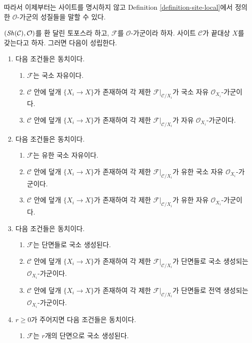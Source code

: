 \noindent
따라서 이제부터는 사이트를 명시하지 않고 Definition
\ref{definition-site-local}에서 정의한 $\mathcal{O}$-가군의 성질들을
말할 수 있다.

\begin{lemma}
\label{lemma-local-final-object}
$(\mathop{\mathit{Sh}}\nolimits(\mathcal{C}), \mathcal{O})$를 환 달린 토포스라 하고,
$\mathcal{F}$를 $\mathcal{O}$-가군이라 하자. 사이트 $\mathcal{C}$가 끝대상
$X$를 갖는다고 하자. 그러면 다음이 성립한다.
\begin{enumerate}
\item 다음 조건들은 동치이다.
\begin{enumerate}
\item $\mathcal{F}$는 국소 자유이다.
\item $\mathcal{C}$ 안에 덮개 $\{X_i \to X\}$가 존재하여 각 제한
$\mathcal{F}|_{\mathcal{C}/X_i}$가 국소 자유 $\mathcal{O}_{X_i}$-가군이다.
\item $\mathcal{C}$ 안에 덮개 $\{X_i \to X\}$가 존재하여 각 제한
$\mathcal{F}|_{\mathcal{C}/X_i}$가 자유 $\mathcal{O}_{X_i}$-가군이다.
\end{enumerate}
\item 다음 조건들은 동치이다.
\begin{enumerate}
\item $\mathcal{F}$는 유한 국소 자유이다.
\item $\mathcal{C}$ 안에 덮개 $\{X_i \to X\}$가 존재하여 각 제한
$\mathcal{F}|_{\mathcal{C}/X_i}$가 유한 국소 자유
$\mathcal{O}_{X_i}$-가군이다.
\item $\mathcal{C}$ 안에 덮개 $\{X_i \to X\}$가 존재하여 각 제한
$\mathcal{F}|_{\mathcal{C}/X_i}$가 유한 자유 $\mathcal{O}_{X_i}$-가군이다.
\end{enumerate}
\item 다음 조건들은 동치이다.
\begin{enumerate}
\item $\mathcal{F}$는 단면들로 국소 생성된다.
\item $\mathcal{C}$ 안에 덮개 $\{X_i \to X\}$가 존재하여 각 제한
$\mathcal{F}|_{\mathcal{C}/X_i}$가 단면들로 국소 생성되는
$\mathcal{O}_{X_i}$-가군이다.
\item $\mathcal{C}$ 안에 덮개 $\{X_i \to X\}$가 존재하여 각 제한
$\mathcal{F}|_{\mathcal{C}/X_i}$가 단면들로 전역 생성되는
$\mathcal{O}_{X_i}$-가군이다.
\end{enumerate}
\item $r \geq 0$가 주어지면 다음 조건들은 동치이다.
\begin{enumerate}
\item $\mathcal{F}$는 $r$개의 단면으로 국소 생성된다.

\end{enumerate}
\end{enumerate}
\end{lemma}
